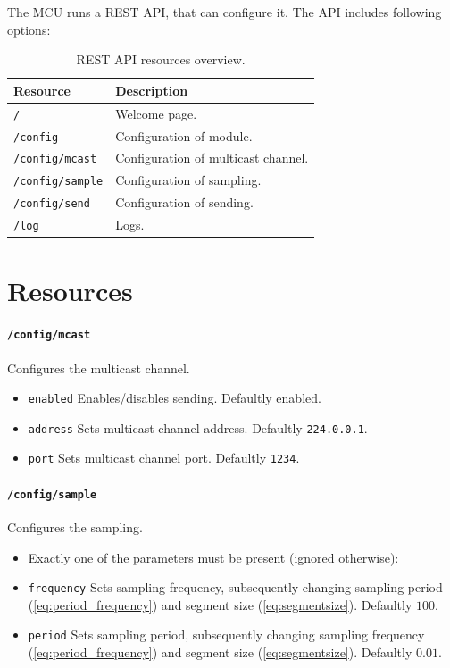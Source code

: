 The MCU runs a REST API, that can configure it. The API includes following options:

\begin{table}[h!]
    \begin{tabular}{|l|l|} \hline
        \textbf{Resource} & \textbf{Description} \\ \hline
        \texttt{/} & Welcome page. \\ \hline
        \texttt{/config} & Configuration of module. \\ \hline
        \texttt{/config/mcast}  & Configuration of multicast channel. \\ \hline
        \texttt{/config/sample} & Configuration of sampling. \\ \hline
        \texttt{/config/send}   & Configuration of sending. \\ \hline
        \texttt{/log}         & Logs. \\ \hline
    \end{tabular}
    \caption{REST API resources overview.}
\end{table}

\section*{Resources}

\paragraph{\texttt{/config/mcast}}
Configures the multicast channel.
\begin{itemize}
    \item[] \texttt{enabled} Enables/disables sending. Defaultly enabled.
    \item[] \texttt{address} Sets multicast channel address. Defaultly \texttt{224.0.0.1}.
    \item[] \texttt{port}    Sets multicast channel port. Defaultly \texttt{1234}.
\end{itemize}

\paragraph{\texttt{/config/sample}}
Configures the sampling.
\begin{itemize}
    \item[] Exactly one of the parameters must be present (ignored otherwise):
    \item[] \texttt{frequency} Sets sampling frequency, subsequently changing sampling period (\ref{eq:period_frequency}) and segment size (\ref{eq:segmentsize}). Defaultly $100$.
    \item[] \texttt{period}    Sets sampling period, subsequently changing sampling frequency (\ref{eq:period_frequency}) and segment size (\ref{eq:segmentsize}). Defaultly $0.01$.
\end{itemize}

